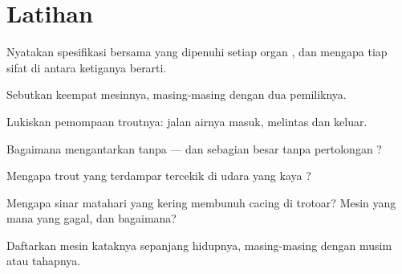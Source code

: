 \section{Latihan}

\begin{exercise}[$\star$]\label{exo:g7:how-animals-breathe:1}
Nyatakan spesifikasi bersama yang dipenuhi setiap organ ,
dan mengapa tiap sifat di antara ketiganya berarti.
\end{exercise}

\begin{exercise}[$\star$]\label{exo:g7:how-animals-breathe:2}
Sebutkan keempat mesinnya, masing-masing dengan dua pemiliknya.
\end{exercise}

\begin{exercise}[$\star$]\label{exo:g7:how-animals-breathe:3}
Lukiskan pemompaan  troutnya: jalan airnya masuk, melintas dan
keluar.
\end{exercise}

\begin{exercise}[$\star$]\label{exo:g7:how-animals-breathe:4}
Bagaimana  mengantarkan  tanpa  --- dan
sebagian besar tanpa pertolongan ?
\end{exercise}

\begin{exercise}[$\star$]\label{exo:g7:how-animals-breathe:5}
Mengapa  trout yang terdampar tercekik di udara yang kaya ?
\end{exercise}

\begin{exercise}[$\star$]\label{exo:g7:how-animals-breathe:6}
Mengapa sinar matahari yang kering membunuh cacing  di trotoar?
Mesin yang mana yang gagal, dan bagaimana?
\end{exercise}

\begin{exercise}[$\star\star$]\label{exo:g7:how-animals-breathe:7}
Daftarkan mesin  kataknya sepanjang hidupnya, masing-masing
dengan musim atau tahapnya.
\end{exercise}

